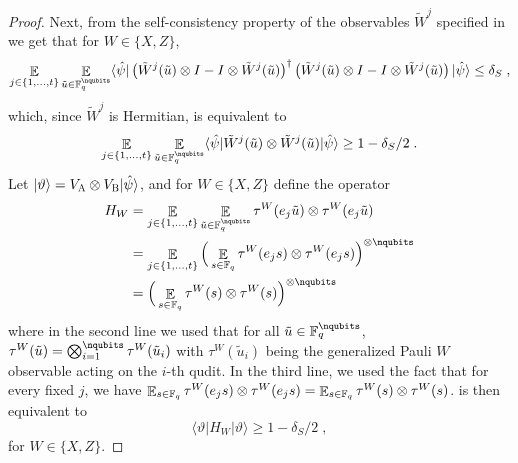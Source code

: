 \documentclass[11pt]{article}
\theoremstyle{definition}
\newcommand{\ket}[1]{|#1\rangle}
\newcommand{\bra}[1]{\langle#1|}
\newcommand{\Id}{\ensuremath{I}}
\newcommand{\F}{\ensuremath{\mathbb{F}}}
\newcommand{\E}{\mathop{\mathbb{E}}\displaylimits}
\newcommand{\labelstyle}[1]{\ensuremath{\textsc{#1}}\xspace}
\newcommand{\alice}{\labelstyle{A}}
\newcommand{\bob}{\labelstyle{B}}
\begin{document}
\begin{proof}
Next, from the self-consistency property of the observables $\tilde{W}^j$ specified in  we get that for $W \in \{X,Z\}$,
\[
	\E_{j \in \{1,\ldots,t\}} \E_{\tilde{u} \in \F_q^\nqubits} \bra{\hat{\psi}} \left ( \tilde{W}^j(\tilde{u}) \otimes \Id - \Id \otimes \tilde{W}^j(\tilde{u}) \right)^\dagger \left ( \tilde{W}^j(\tilde{u}) \otimes \Id - \Id \otimes \tilde{W}^j(\tilde{u}) \right) \ket{\hat{\psi}} \leq \delta_S\;,
\]
which, since $\tilde{W}^j$ is Hermitian, is equivalent to
\begin{equation}
\label{eq:qld-unitary-1}
\E_{j \in \{1,\ldots,t\}} \E_{\tilde{u} \in \F_q^\nqubits} \bra{\hat{\psi}} \tilde{W}^j(\tilde{u}) \otimes \tilde{W}^j(\tilde{u}) \ket{\hat{\psi}} \geq 1 - \delta_S/2\;.
\end{equation}
Let $\ket{\vartheta} = V_\alice \otimes V_\bob \ket{\hat{\psi}}$, and for $W \in \{X,Z\}$ define the operator
\begin{align*}
	H_W &= \E_{j \in \{1,\ldots,t\}} \E_{\tilde{u} \in \F_q^\nqubits} \tau^W(e_j \tilde{u}) \otimes \tau^W(e_j \tilde{u}) \\
		&= \E_{j \in \{1,\ldots,t\}} \Big ( \E_{s \in \F_q} \tau^W(e_j s) \otimes \tau^W(e_j s) \Big)^{\otimes \nqubits} \\
		&= \Big ( \E_{s \in \F_q} \tau^W(s) \otimes \tau^W(s) \Big)^{\otimes \nqubits}
\end{align*}
where in the second line we used that for all $\tilde{u} \in \F_q^\nqubits$, $\tau^W(\tilde{u}) = \bigotimes_{i = 1}^\nqubits \tau^W(\tilde{u}_i)$ with $\tau^W(\tilde{u}_i)$ being the generalized Pauli $W$ observable acting on the $i$-th qudit. In the third line, we used the fact that for every fixed $j$, we have $\E_{s \in \F_q} \tau^W(e_j s) \otimes \tau^W(e_j s) = \E_{s \in \F_q} \tau^W(s) \otimes \tau^W(s)$.  is then equivalent to 
\[
	\bra{\vartheta} H_W \ket{\vartheta} \geq 1 - \delta_S/2\;,
\]
for $W \in \{X,Z\}$. 


\end{proof}
\end{document}
